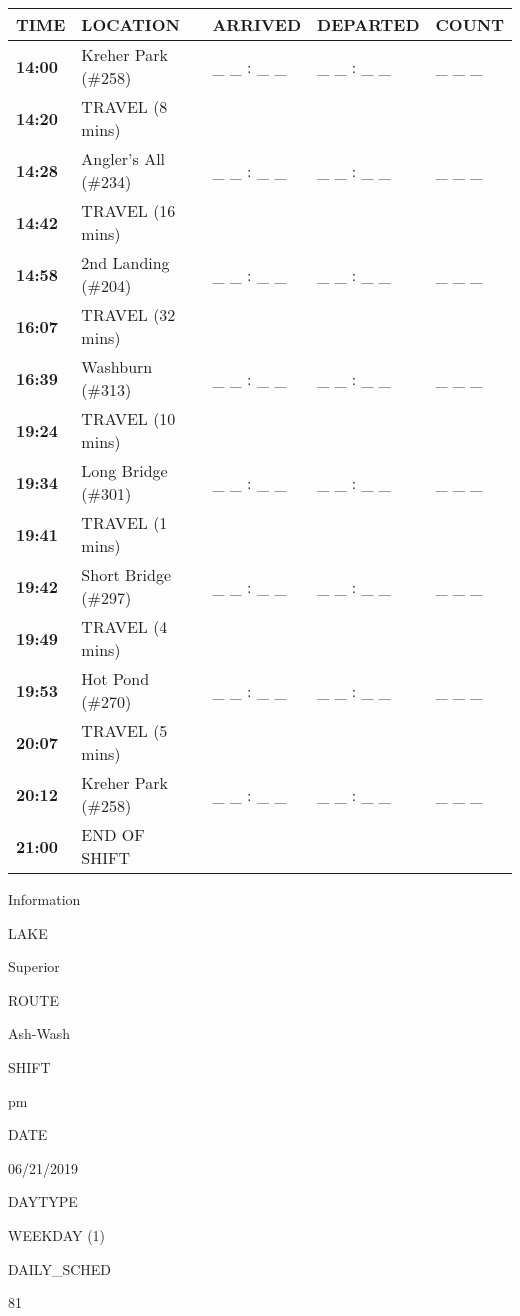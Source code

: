 \documentclass[]{article}
\begin{document}
\begin{tabular}{>{\bfseries}lllll}
\toprule
\textbf{TIME} & \textbf{LOCATION} & \textbf{ARRIVED} & \textbf{DEPARTED} & \textbf{COUNT}\\
\midrule
14:00 & Kreher Park (\#258) & \_ \_ : \_ \_ & \_ \_ : \_ \_ & \_ \_ \_\\
14:20 & TRAVEL (8 mins) &  &  & \\
14:28 & Angler's All (\#234) & \_ \_ : \_ \_ & \_ \_ : \_ \_ & \_ \_ \_\\
14:42 & TRAVEL (16 mins) &  &  & \\
14:58 & 2nd Landing (\#204) & \_ \_ : \_ \_ & \_ \_ : \_ \_ & \_ \_ \_\\
16:07 & TRAVEL (32 mins) &  &  & \\
16:39 & Washburn (\#313) & \_ \_ : \_ \_ & \_ \_ : \_ \_ & \_ \_ \_\\
19:24 & TRAVEL (10 mins) &  &  & \\
19:34 & Long Bridge (\#301) & \_ \_ : \_ \_ & \_ \_ : \_ \_ & \_ \_ \_\\
19:41 & TRAVEL (1 mins) &  &  & \\
19:42 & Short Bridge (\#297) & \_ \_ : \_ \_ & \_ \_ : \_ \_ & \_ \_ \_\\
19:49 & TRAVEL (4 mins) &  &  & \\
19:53 & Hot Pond (\#270) & \_ \_ : \_ \_ & \_ \_ : \_ \_ & \_ \_ \_\\
20:07 & TRAVEL (5 mins) &  &  & \\
20:12 & Kreher Park (\#258) & \_ \_ : \_ \_ & \_ \_ : \_ \_ & \_ \_ \_\\
21:00 & END OF SHIFT &  &  & \\
\bottomrule
\end{tabular}\newpage

Information

LAKE

Superior

ROUTE

Ash-Wash

SHIFT

pm

DATE

06/21/2019

DAYTYPE

WEEKDAY (1)

DAILY\_SCHED

81

\vspace{24pt}
\end{document}
